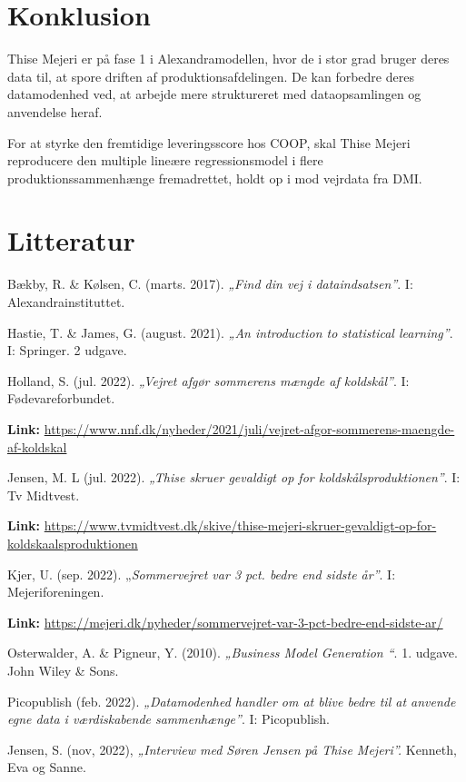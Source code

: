 \documentclass[
  12pt,
  a4paper,
  DIV=11,
  numbers=noendperiod]{scrartcl}
\begin{document}
\hypertarget{konklusion}{%
\section{Konklusion}\label{konklusion}}

Thise Mejeri er på fase 1 i Alexandramodellen, hvor de i stor grad
bruger deres data til, at spore driften af produktionsafdelingen. De kan
forbedre deres datamodenhed ved, at arbejde mere struktureret med
dataopsamlingen og anvendelse heraf.

For at styrke den fremtidige leveringsscore hos COOP, skal Thise Mejeri
reproducere den multiple lineære regressionsmodel i flere
produktionssammenhænge fremadrettet, holdt op i mod vejrdata fra DMI.

\hypertarget{litteratur}{%
\section{Litteratur}\label{litteratur}}

Bækby, R. \& Kølsen, C. (marts. 2017). \emph{„Find din vej i
dataindsatsen''}. I: Alexandrainstituttet.

Hastie, T. \& James, G. (august. 2021). \emph{„An introduction to
statistical learning''}. I: Springer. 2 udgave.

Holland, S. (jul. 2022). \emph{„Vejret afgør sommerens mængde af
koldskål''}. I: Fødevareforbundet.

\textbf{Link:}
\url{https://www.nnf.dk/nyheder/2021/juli/vejret-afgor-sommerens-maengde-af-koldskal}

Jensen, M. L (jul. 2022). \emph{„Thise skruer gevaldigt op for
koldskålsproduktionen''}. I: Tv Midtvest.

\textbf{Link:}
\url{https://www.tvmidtvest.dk/skive/thise-mejeri-skruer-gevaldigt-op-for-koldskaalsproduktionen}

Kjer, U. (sep. 2022). „\emph{Sommervejret var 3 pct. bedre end sidste
år''}. I: Mejeriforeningen.

\textbf{Link:}
\url{https://mejeri.dk/nyheder/sommervejret-var-3-pct-bedre-end-sidste-ar/}

Osterwalder, A. \& Pigneur, Y. (2010). \emph{„Business Model Generation
``}. 1. udgave. John Wiley \& Sons.

Picopublish (feb. 2022). \emph{„Datamodenhed handler om at blive bedre
til at anvende egne data i værdiskabende sammenhænge''}. I: Picopublish.

Jensen, S. (nov, 2022), \emph{„Interview med Søren Jensen på Thise
Mejeri''.} Kenneth, Eva og Sanne.
\end{document}
